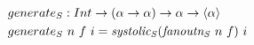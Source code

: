 \documentclass[preview]{standalone}
\begin{document}
\begin{align*}
  generate_S &: Int \rightarrow (\alpha \rightarrow \alpha) \rightarrow \alpha \rightarrow \vect{\alpha} \\
  generate_S &\ n\ f\ i = \mathit{systolic_S} (\mathit{fanoutn_S}\ n\ f)\ i
\end{align*}
\end{document}
